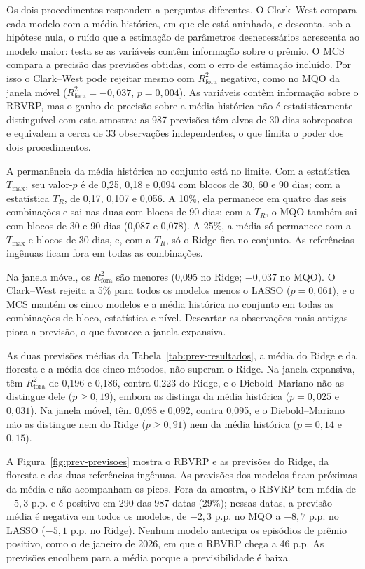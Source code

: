 Os dois procedimentos respondem a perguntas diferentes. O Clark--West compara
cada modelo com a média histórica, em que ele está aninhado, e desconta, sob a
hipótese nula, o ruído que a estimação de parâmetros desnecessários acrescenta
ao modelo maior: testa se as variáveis contêm informação sobre o prêmio. O MCS
compara a precisão das previsões obtidas, com o erro de estimação incluído. Por
isso o Clark--West pode rejeitar mesmo com $R^2_{\text{fora}}$ negativo, como no
MQO da janela móvel ($R^2_{\text{fora}} = -0{,}037$, $p = 0{,}004$). As
variáveis contêm informação sobre o RBVRP, mas o ganho de precisão sobre a média
histórica não é estatisticamente distinguível com esta amostra: as 987
previsões têm alvos de 30 dias sobrepostos e equivalem a cerca de 33
observações independentes, o que limita o poder dos dois procedimentos.

A permanência da média histórica no conjunto está no limite. Com a estatística
$T_{\max}$, seu valor-$p$ é de 0,25, 0,18 e 0,094 com blocos de 30, 60 e 90
dias; com a estatística $T_R$, de 0,17, 0,107 e 0,056. A 10\%, ela permanece
em quatro das seis combinações e sai nas duas com blocos de 90 dias; com a
$T_R$, o MQO também sai com blocos de 30 e 90 dias (0,087 e 0,078). A 25\%, a
média só permanece com a $T_{\max}$ e blocos de 30 dias, e, com a $T_R$, só o
Ridge fica no conjunto. As referências ingênuas ficam fora em todas as
combinações.

Na janela móvel, os $R^2_{\text{fora}}$ são menores (0,095 no Ridge; $-0{,}037$
no MQO). O Clark--West rejeita a 5\% para todos os modelos menos o LASSO
($p = 0{,}061$), e o MCS mantém os cinco modelos e a média histórica no
conjunto em todas as combinações de bloco, estatística e nível. Descartar as
observações mais antigas piora a previsão, o que favorece a janela expansiva.

As duas previsões médias da Tabela~\ref{tab:prev-resultados}, a média do Ridge
e da floresta e a média dos cinco métodos, não superam o Ridge. Na janela
expansiva, têm $R^2_{\text{fora}}$ de 0,196 e 0,186, contra 0,223 do Ridge, e o
Diebold--Mariano não as distingue dele ($p \ge 0{,}19$), embora as distinga da
média histórica ($p = 0{,}025$ e $0{,}031$). Na janela móvel, têm 0,098 e
0,092, contra 0,095, e o Diebold--Mariano não as distingue nem do Ridge
($p \ge 0{,}91$) nem da média histórica ($p = 0{,}14$ e $0{,}15$).

A Figura~\ref{fig:prev-previsoes} mostra o RBVRP e as previsões do Ridge, da
floresta e das duas referências ingênuas. As previsões dos modelos ficam
próximas da média e não acompanham os picos. Fora da amostra, o RBVRP tem média
de $-5{,}3$ p.p. e é positivo em 290 das 987 datas (29\%); nessas datas, a
previsão média é negativa em todos os modelos, de $-2{,}3$ p.p. no MQO a
$-8{,}7$ p.p. no LASSO ($-5{,}1$ p.p. no Ridge). Nenhum modelo antecipa os
episódios de prêmio positivo, como o de janeiro de 2026, em que o RBVRP chega a
46 p.p. As previsões encolhem para a média porque a previsibilidade é baixa.


